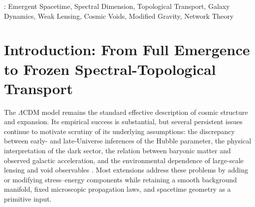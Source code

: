 \documentclass[12pt]{iopart}
\begin{document}
\begin{abstract}
The fixed ATP+baryon model is compared with NFW+baryon controls using information criteria.

The void sector provides an independent diagnostic of the same graph motif. DRND II predicts a compensated-wall topological gain
\[
\eta_{\mathrm{wall}}
=
\frac{|F^\star|}{2}
=
\frac{19}{2},
\]
leading to the locked amplitude
\[
A_{\mathrm{DRND}}^{19/2}(z)
=
\frac{19}{2}A_{\Omega_b}(z).
\]
In the current SDSS \(R/R_v\) covariance diagnostic, this locked amplitude matches the required void-wall amplitude at the sub-percent level,
\[
A_{\mathrm{DRND}}^{19/2}/A_{\mathrm{required}}=0.99497,
\]
and is preferred by BIC over both the null model and the same morphology with a fitted amplitude.

The paper reports these results as parameter-free positive diagnostic evidence for the frozen DRND-ST/ATP sector, not as a general exclusion of \(\Lambda\)CDM, NFW halos, or particle dark matter. Variable-\(c_{\mathrm{eff}}(z)\) cosmology, evolving \(\hbar\) and \(G\), CMB anomalies, full relativistic field equations, and complete microscopic graph dynamics are retained as future-work extensions. The dark-matter phenomenology is treated within the frozen DRND II sector through explicit baryons, spectral transport, ATP lensing, and void-wall topology; only its final microscopic interpretation is deferred. An appendix presents a conjectural microscopic phase-resonance mass-spectrum extension, including the charged-lepton resonance \(\theta_\ell=2/9\), but this is not claimed as a completed derivation of the Standard Model.
\end{abstract}

\vspace{2pc}
: Emergent Spacetime, Spectral Dimension, Topological Transport, Galaxy Dynamics, Weak Lensing, Cosmic Voids, Modified Gravity, Network Theory

\maketitle


\section{Introduction: From Full Emergence to Frozen Spectral-Topological Transport}
\label{sec:introduction}

The $\Lambda$CDM model remains the standard effective description of cosmic structure and expansion. Its empirical success is substantial, but several persistent issues continue to motivate scrutiny of its underlying assumptions: the discrepancy between early- and late-Universe inferences of the Hubble parameter, the physical interpretation of the dark sector, the relation between baryonic matter and observed galactic acceleration, and the environmental dependence of large-scale lensing and void observables \cite{Riess2022,Labbe2023}. Most extensions address these problems by adding or modifying stress--energy components while retaining a smooth background manifold, fixed microscopic propagation laws, and spacetime geometry as a primitive input.
\end{document}
